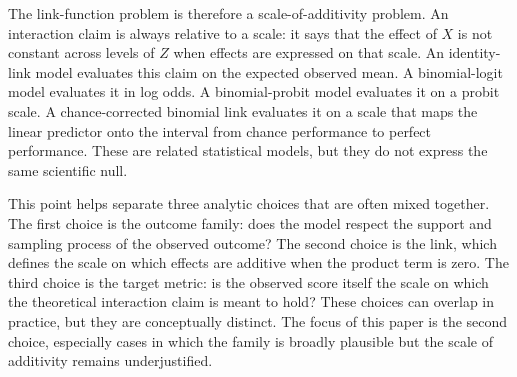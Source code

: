 \documentclass[
  man,
  longtable,
  nolmodern,
  notxfonts,
  notimes,
  colorlinks=true,linkcolor=blue,citecolor=blue,urlcolor=blue]{apa7}
\begin{document}
The link-function problem is therefore a scale-of-additivity problem. An
interaction claim is always relative to a scale: it says that the effect
of \(X\) is not constant across levels of \(Z\) when effects are
expressed on that scale. An identity-link model evaluates this claim on
the expected observed mean. A binomial-logit model evaluates it in log
odds. A binomial-probit model evaluates it on a probit scale. A
chance-corrected binomial link evaluates it on a scale that maps the
linear predictor onto the interval from chance performance to perfect
performance. These are related statistical models, but they do not
express the same scientific null.

This point helps separate three analytic choices that are often mixed
together. The first choice is the outcome family: does the model respect
the support and sampling process of the observed outcome? The second
choice is the link, which defines the scale on which effects are
additive when the product term is zero. The third choice is the target
metric: is the observed score itself the scale on which the theoretical
interaction claim is meant to hold? These choices can overlap in
practice, but they are conceptually distinct. The focus of this paper is
the second choice, especially cases in which the family is broadly
plausible but the scale of additivity remains underjustified.
\end{document}

